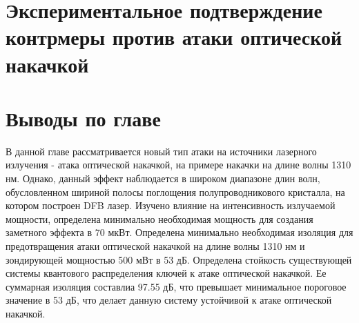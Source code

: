 \section{Экспериментальное подтверждение контрмеры против атаки оптической накачкой}\label{sec:ch4/sect7}

\section{Выводы по главе}\label{sec:ch4/sect8}
В данной главе рассматривается новый тип атаки на источники лазерного излучения - атака оптической накачкой, на примере накачки на длине волны 1310 нм. Однако, данный эффект наблюдается в широком диапазоне длин волн, обусловленном шириной полосы поглощения полупроводникового кристалла, на котором построен DFB лазер. 
Изучено влияние на интенсивность излучаемой мощности, определена минимально необходимая мощность для создания заметного эффекта в 70 мкВт. Определена минимально необходимая изоляция для предотвращения атаки оптической накачкой на длине волны 1310 нм и зондирующей мощностью 500 мВт в 53 дБ.
Определена стойкость существующей системы квантового распределения ключей к атаке оптической накачкой. Ее суммарная изоляция составлиа 97.55 дБ, что превышает минимальное пороговое значение в 53 дБ, что делает данную систему устойчивой к атаке оптической накачкой. 
